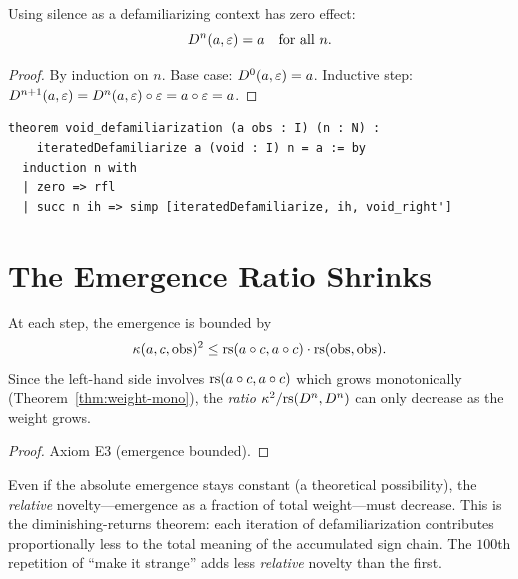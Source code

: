 \begin{theorem}
\label{thm:void-defam}
Using silence as a defamiliarizing context has zero effect:
\[
  D^n(a, \varepsilon) = a \quad \text{for all } n.
\]
\end{theorem}

\begin{proof}
By induction on $n$.  Base case: $D^0(a, \varepsilon) = a$.
Inductive step: $D^{n+1}(a, \varepsilon) = D^n(a, \varepsilon) \circ \varepsilon
= a \circ \varepsilon = a$.
\end{proof}

\begin{lstlisting}
theorem void_defamiliarization (a obs : I) (n : N) :
    iteratedDefamiliarize a (void : I) n = a := by
  induction n with
  | zero => rfl
  | succ n ih => simp [iteratedDefamiliarize, ih, void_right']
\end{lstlisting}

\section{The Emergence Ratio Shrinks}

\begin{theorem}
\label{thm:ratio-bound}
At each step, the emergence is bounded by
\[
  \kappa(a, c, \mathrm{obs})^2 \leq \mathrm{rs}(a \circ c, a \circ c) \cdot \mathrm{rs}(\mathrm{obs}, \mathrm{obs}).
\]
Since the left-hand side involves $\mathrm{rs}(a \circ c, a \circ c)$
which grows monotonically (Theorem~\ref{thm:weight-mono}), the
\emph{ratio} $\kappa^2 / \mathrm{rs}(D^n, D^n)$ can only decrease as the
weight grows.
\end{theorem}

\begin{proof}
Axiom E3 (emergence bounded).
\end{proof}

\begin{remark}
Even if the absolute emergence stays constant (a theoretical possibility),
the \emph{relative} novelty---emergence as a fraction of total weight---must
decrease.  This is the diminishing-returns theorem: each iteration of
defamiliarization contributes proportionally less to the total meaning
of the accumulated sign chain.  The $100$th repetition of ``make it
strange'' adds less \emph{relative} novelty than the first.
\end{remark}



